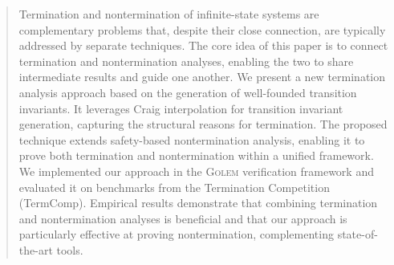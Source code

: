 \documentclass[runningheads]{llncs}
\theoremstyle{definition}
\begin{document}
%
\maketitle              %
%


\begin{abstract}
Termination and nontermination of infinite-state systems are complementary problems that, 
despite their close connection, are typically addressed by separate techniques.
The core idea of this paper is to connect termination and nontermination analyses,
enabling the two to share intermediate results and guide one another.
We present a new termination analysis approach based on the
generation of well-founded transition invariants. 
It leverages Craig interpolation for transition invariant 
generation, capturing the structural reasons for termination.
The proposed technique extends safety-based nontermination analysis, enabling it to prove both 
termination and nontermination within a unified framework.
We implemented our approach in the \textsc{Golem} verification framework and evaluated it on benchmarks from the 
Termination Competition (TermComp). 
Empirical results demonstrate that combining termination and nontermination analyses is beneficial and
that our approach is particularly effective at proving nontermination, complementing state-of-the-art tools.
\end{abstract}

%



%



%



%



%



%



%








\end{document}
